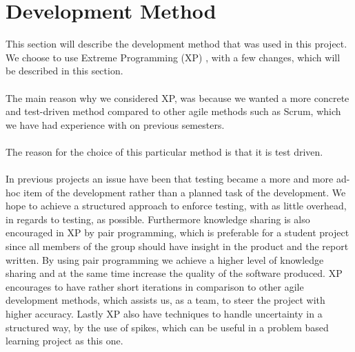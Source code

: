 
\section{Development Method}
\label{sec:development_method}

This section will describe the development method that was used in this project. We choose to use Extreme Programming (XP) \parencite{xp}, with a few changes, which will be described in this section.
\\\\
The main reason why we considered XP, was because we wanted a more concrete and test-driven method compared to other agile methods such as Scrum, which we have had experience with on previous semesters.
\\\\
The reason for the choice of this particular method is that it is test driven. 
\\\\
In previous projects an issue have been that testing became a more and more ad-hoc item of the development rather than a planned task of the development. We hope to achieve a structured approach to enforce testing, with as little overhead, in regards to testing, as possible. Furthermore knowledge sharing is also encouraged in XP by pair programming, which is preferable for a student project since all members of the group should have insight in the product and the report written. By using pair programming we achieve a higher level of knowledge sharing and at the same time increase the quality of the software produced. XP encourages to have rather short iterations in comparison to other agile development methods, which assists us, as a team, to steer the project with higher accuracy. Lastly XP also have techniques to handle uncertainty in a structured way, by the use of spikes, which can be useful in a problem based learning project as this one. 
\\\\

